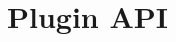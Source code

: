 \documentclass[\rootfolder/main.tex]{subfiles}
\begin{document}
\section{Plugin API}
\end{document}
